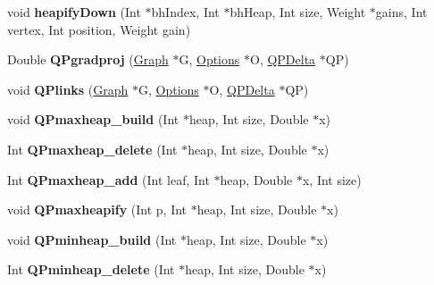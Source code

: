 \begin{DoxyCompactItemize}
\hypertarget{namespace_mongoose_a93aac21b1cecbc1e70d4a002a1835685}{}\label{namespace_mongoose_a93aac21b1cecbc1e70d4a002a1835685} 
void {\bfseries heapify\+Down} (Int $\ast$bh\+Index, Int $\ast$bh\+Heap, Int size, Weight $\ast$gains, Int vertex, Int position, Weight gain)
\item 
\hypertarget{namespace_mongoose_aff1455ca46f26632064dc5c099197bb8}{}\label{namespace_mongoose_aff1455ca46f26632064dc5c099197bb8} 
Double {\bfseries Q\+Pgradproj} (\hyperlink{class_mongoose_1_1_graph}{Graph} $\ast$G, \hyperlink{struct_mongoose_1_1_options}{Options} $\ast$O, \hyperlink{class_mongoose_1_1_q_p_delta}{Q\+P\+Delta} $\ast$QP)
\item 
\hypertarget{namespace_mongoose_abd1a702300e73d1c64a254e35fe6c1c6}{}\label{namespace_mongoose_abd1a702300e73d1c64a254e35fe6c1c6} 
void {\bfseries Q\+Plinks} (\hyperlink{class_mongoose_1_1_graph}{Graph} $\ast$G, \hyperlink{struct_mongoose_1_1_options}{Options} $\ast$O, \hyperlink{class_mongoose_1_1_q_p_delta}{Q\+P\+Delta} $\ast$QP)
\item 
\hypertarget{namespace_mongoose_a43dcd62b139a178623d33624dbc994be}{}\label{namespace_mongoose_a43dcd62b139a178623d33624dbc994be} 
void {\bfseries Q\+Pmaxheap\+\_\+build} (Int $\ast$heap, Int size, Double $\ast$x)
\item 
\hypertarget{namespace_mongoose_ac88ec812c9b32e3881de25d7355407ac}{}\label{namespace_mongoose_ac88ec812c9b32e3881de25d7355407ac} 
Int {\bfseries Q\+Pmaxheap\+\_\+delete} (Int $\ast$heap, Int size, Double $\ast$x)
\item 
\hypertarget{namespace_mongoose_ae5d4e76f2b895b0cd57411c90d785c8e}{}\label{namespace_mongoose_ae5d4e76f2b895b0cd57411c90d785c8e} 
Int {\bfseries Q\+Pmaxheap\+\_\+add} (Int leaf, Int $\ast$heap, Double $\ast$x, Int size)
\item 
\hypertarget{namespace_mongoose_a150c22316d183d1376a1f680e9841645}{}\label{namespace_mongoose_a150c22316d183d1376a1f680e9841645} 
void {\bfseries Q\+Pmaxheapify} (Int p, Int $\ast$heap, Int size, Double $\ast$x)
\item 
\hypertarget{namespace_mongoose_a02335fa458806bd2056cc3ae9a05b9d9}{}\label{namespace_mongoose_a02335fa458806bd2056cc3ae9a05b9d9} 
void {\bfseries Q\+Pminheap\+\_\+build} (Int $\ast$heap, Int size, Double $\ast$x)
\item 
\hypertarget{namespace_mongoose_a7faebca8062d2e852634bad3500b1a3c}{}\label{namespace_mongoose_a7faebca8062d2e852634bad3500b1a3c} 
Int {\bfseries Q\+Pminheap\+\_\+delete} (Int $\ast$heap, Int size, Double $\ast$x)

\end{DoxyCompactItemize}
